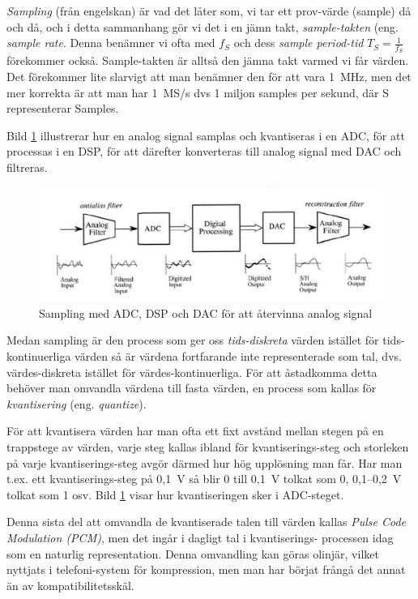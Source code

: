 \emph{Sampling} (från engelskan) är vad det låter som, vi tar ett prov-värde
(sample) då och då, och i detta sammanhang gör vi det i en jämn takt,
\emph{sample-takten} (eng. \emph{sample rate}.
Denna benämner vi ofta med \(f_S\) och dess \emph{sample period-tid}
\(T_S=\frac{1}{f_S}\) förekommer också.
Sample-takten är alltså den jämna takt varmed vi får värden.
Det förekommer lite slarvigt att man benämner den för att vara 1~MHz, men det
mer korrekta är att man har 1~MS/s dvs 1 miljon samples per sekund, där S
representerar Samples.

Bild \ref{fig:BildII1-37} illustrerar hur en analog signal samplas och
kvantiseras i en ADC, för att processas i en DSP, för att därefter konverteras
till analog signal med DAC och filtreras.

\begin{figure}
\begin{center}
\includegraphics[width=\textwidth]{images/cropped_pdfs/bild_2_1-37.pdf}
\caption{Sampling med ADC, DSP och DAC för att återvinna analog signal}
\label{fig:BildII1-37}
\end{center}
\end{figure}

Medan sampling är den process som ger oss \emph{tids-diskreta} värden istället
för tids-kontinuerliga värden så är värdena fortfarande inte representerade som
tal, dvs. värdes-diskreta istället för värdes-kontinuerliga.
För att åstadkomma detta behöver man omvandla värdena till fasta värden, en
process som kallas för \emph{kvantisering} (eng. \emph{quantize}).

För att kvantisera värden har man ofta ett fixt avstånd mellan stegen på en
trappstege av värden, varje steg kallas ibland för kvantiserings-steg och
storleken på varje kvantiserings-steg avgör därmed hur hög upplösning man får.
Har man t.ex. ett kvantiserings-steg på 0,1~V så blir 0 till 0,1~V tolkat som
0, 0,1--0,2~V tolkat som 1 osv.
Bild \ref{fig:BildII1-37} visar hur kvantiseringen sker i ADC-steget.

Denna sista del att omvandla de kvantiserade talen till värden kallas
\emph{Pulse Code Modulation (PCM)}, men det ingår i dagligt tal i kvantiserings-
processen idag som en naturlig representation.
Denna omvandling kan göras olinjär, vilket nyttjats i telefoni-system för
kompression, men man har börjat frångå det annat än av kompatibilitetsskäl.

